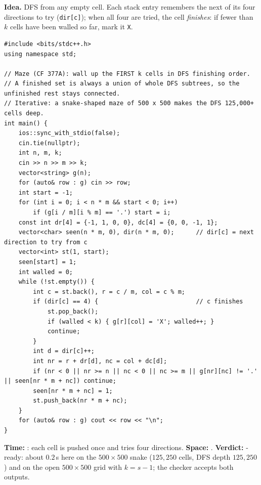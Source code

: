 \begin{algorithmbox}
\textbf{Idea.} DFS from any empty cell. Each stack entry remembers the next of its four directions to try (\texttt{dir[c]}); when all four are tried, the cell \emph{finishes}: if fewer than $k$ cells have been walled so far, mark it \texttt{X}.

\begin{lstlisting}[style=cpp]
#include <bits/stdc++.h>
using namespace std;

// Maze (CF 377A): wall up the FIRST k cells in DFS finishing order.
// A finished set is always a union of whole DFS subtrees, so the unfinished rest stays connected.
// Iterative: a snake-shaped maze of 500 x 500 makes the DFS 125,000+ cells deep.
int main() {
    ios::sync_with_stdio(false);
    cin.tie(nullptr);
    int n, m, k;
    cin >> n >> m >> k;
    vector<string> g(n);
    for (auto& row : g) cin >> row;
    int start = -1;
    for (int i = 0; i < n * m && start < 0; i++)
        if (g[i / m][i % m] == '.') start = i;
    const int dr[4] = {-1, 1, 0, 0}, dc[4] = {0, 0, -1, 1};
    vector<char> seen(n * m, 0), dir(n * m, 0);      // dir[c] = next direction to try from c
    vector<int> st(1, start);
    seen[start] = 1;
    int walled = 0;
    while (!st.empty()) {
        int c = st.back(), r = c / m, col = c % m;
        if (dir[c] == 4) {                           // c finishes
            st.pop_back();
            if (walled < k) { g[r][col] = 'X'; walled++; }
            continue;
        }
        int d = dir[c]++;
        int nr = r + dr[d], nc = col + dc[d];
        if (nr < 0 || nr >= n || nc < 0 || nc >= m || g[nr][nc] != '.' || seen[nr * m + nc]) continue;
        seen[nr * m + nc] = 1;
        st.push_back(nr * m + nc);
    }
    for (auto& row : g) cout << row << "\n";
}
\end{lstlisting}

\begin{complexitybox}
\textbf{Time:} : each cell is pushed once and tries four directions. \textbf{Space:} . \textbf{Verdict:} \ac{}-ready: about $0.2$\,s here on the $500 \times 500$ snake ($125{,}250$ cells, DFS depth $125{,}250$) and on the open $500 \times 500$ grid with $k = s - 1$; the checker accepts both outputs.
\end{complexitybox}
\end{algorithmbox}

